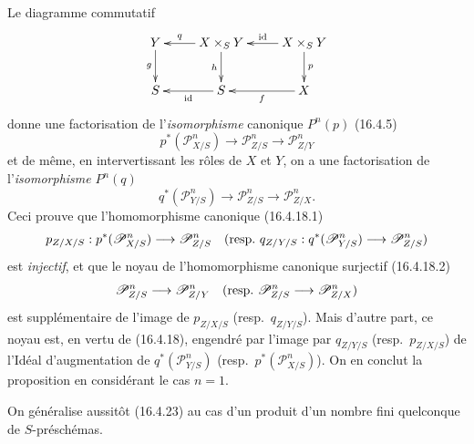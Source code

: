 Le diagramme commutatif
\[
  \xymatrix{
    Y\ar[d]_-g&X\times_S Y\ar[l]_-q\ar[d]_-h&
      X\times_S Y\ar[l]_-{\operatorname{id}}\ar[d]^-p\\
    S&S\ar[l]^-{\operatorname{id}}&X\ar[l]^-f
  }
\]
donne une factorisation de l'\emph{isomorphisme} canonique $P^n(p)$ (16.4.5)
\[
  p^*(\mathscr{P}_{X/S}^n)\longrightarrow
  \mathscr{P}_{Z/S}^n\longrightarrow\mathscr{P}_{Z/Y}^n
\]
et de même, en intervertissant les rôles de $X$ et $Y$, on a une factorisation
de l'\emph{isomorphisme} $P^n(q)$
\[
  q^*(\mathscr{P}_{Y/S}^n)\longrightarrow
  \mathscr{P}_{Z/S}^n\longrightarrow\mathscr{P}_{Z/X}^n.
\]
Ceci prouve que l'homomorphisme canonique (16.4.18.1)
\[
  p_{Z/X/S}:p^*(\mathscr{P}_{X/S}^n)\longrightarrow\mathscr{P}_{Z/S}^n
  \quad\text{(resp.\
  $q_{Z/Y/S}:q^*(\mathscr{P}_{Y/S}^n)\to\mathscr{P}_{Z/S}^n$)}
\]
est \emph{injectif}, et que le noyau de l'homomorphisme canonique surjectif
(16.4.18.2)
\[
  \mathscr{P}_{Z/S}^n\longrightarrow\mathscr{P}_{Z/Y}^n
  \quad\text{(resp.\
  $\mathscr{P}_{Z/S}^n\to\mathscr{P}_{Z/X}^n$)}
\]
est supplémentaire de l'image de $p_{Z/X/S}$ (resp.\ $q_{Z/Y/S}$). Mais
d'autre part, ce noyau est, en vertu de (16.4.18), engendré par l'image par
$q_{Z/Y/S}$ (resp.\ $p_{Z/X/S}$) de l'Idéal d'augmentation de
$q^*(\mathscr{P}_{Y/S}^n)$ (resp.\ $p^*(\mathscr{P}_{X/S}^n)$). On en conclut
la proposition en considérant le cas $n=1$.

On généralise aussitôt (16.4.23) au cas d'un produit d'un nombre fini
quelconque de $S$-préschémas.


